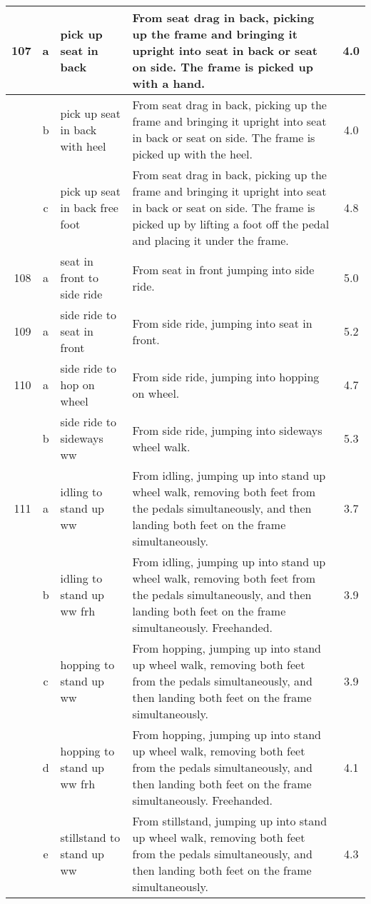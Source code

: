\begin{longtable}{|r|c|p{4cm}|p{8cm}|c|}
\hline
107 & a & pick up seat in back  & From seat drag in back, picking up the frame and bringing it upright into seat in back or seat on side. The frame is picked up with a hand. & 4.0 \\ 
\hline
  & b & pick up seat in back with heel  & From seat drag in back, picking up the frame and bringing it upright into seat in back or seat on side. The frame is picked up with the heel. & 4.0 \\ 
\hline
  & c & pick up seat in back free foot  & From seat drag in back, picking up the frame and bringing it upright into seat in back or seat on side. The frame is picked up by lifting a foot off the pedal and placing it under the frame.  & 4.8 \\ 
\hline
108 & a & seat in front to side ride  & From seat in front jumping into side ride.  & 5.0 \\ 
\hline
109 & a & side ride to seat in front  & From side ride, jumping into seat in front. & 5.2 \\ 
\hline
110 & a & side ride to hop on wheel & From side ride, jumping into hopping on wheel.  & 4.7 \\ 
\hline
  & b & side ride to sideways ww  & From side ride, jumping into sideways wheel walk. & 5.3 \\ 
\hline
111 & a & idling to stand up ww & From idling, jumping up into stand up wheel walk, removing both feet from the pedals simultaneously, and then landing both feet on the frame simultaneously.  & 3.7 \\ 
\hline
  & b & idling to stand up ww frh & From idling, jumping up into stand up wheel walk, removing both feet from the pedals simultaneously, and then landing both feet on the frame simultaneously. Freehanded.  & 3.9 \\ 
\hline
  & c & hopping to stand up ww  & From hopping, jumping up into stand up wheel walk, removing both feet from the pedals simultaneously, and then landing both feet on the frame simultaneously. & 3.9 \\ 
\hline
  & d & hopping to stand up ww frh  & From hopping, jumping up into stand up wheel walk, removing both feet from the pedals simultaneously, and then landing both feet on the frame simultaneously. Freehanded. & 4.1 \\ 
\hline
  & e & stillstand to stand up ww & From stillstand, jumping up into stand up wheel walk, removing both feet from the pedals simultaneously, and then landing both feet on the frame simultaneously.  & 4.3 \\ 

\end{longtable}
